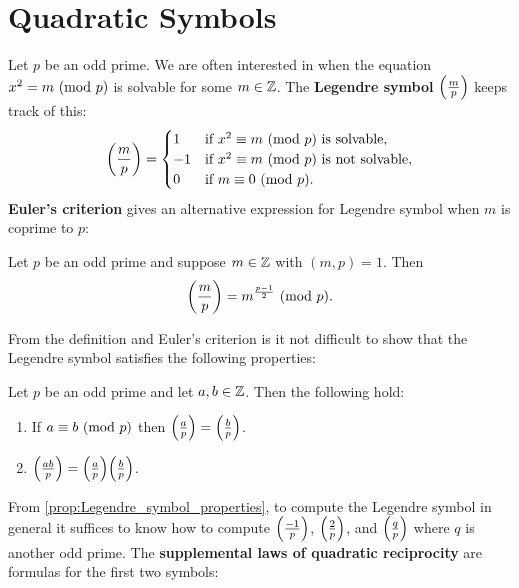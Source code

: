   \section{Quadratic Symbols}\label{append:Quadratic_Symbols}
    Let $p$ be an odd prime. We are often interested in when the equation $x^{2} = m \ (\mathrm{mod}\text{ }p)$ is solvable for some $m \in \mathbb{Z}$. The \textbf{Legendre symbol} $\textstyle{\left(\frac{m}{p}\right)}$ keeps track of this:
    \[
      \left(\frac{m}{p}\right) = \begin{cases} 1 & \text{if $x^{2} \equiv m \ (\mathrm{mod}\text{ }p)$ is solvable}, \\ -1 & \text{if $x^{2} \equiv m \ (\mathrm{mod}\text{ }p)$ is not solvable}, \\ 0 & \text{if $m \equiv 0 \ (\mathrm{mod}\text{ }p)$}. \end{cases}
    \]
    \textbf{Euler's criterion} gives an alternative expression for Legendre symbol when $m$ is coprime to $p$:
    \begin{proposition*}
      Let $p$ be an odd prime and suppose $m \in \mathbb{Z}$ with $(m,p) = 1$. Then
      \[
        \left(\frac{m}{p}\right) = m^{\frac{p-1}{2}} \ (\mathrm{mod}\text{ }p).
      \]
    \end{proposition*}
    From the definition and Euler's criterion is it not difficult to show that the Legendre symbol satisfies the following properties:
    \begin{proposition}\label{prop:Legendre_symbol_properties}
      Let $p$ be an odd prime and let $a,b \in \mathbb{Z}$. Then the following hold:
      \begin{enumerate}[label=(\roman*)]
        \item If $a \equiv b \ (\mathrm{mod}\text{ }p)$ then $\textstyle{\left(\frac{a}{p}\right)} = \textstyle{\left(\frac{b}{p}\right)}$.
        \item $\textstyle{\left(\frac{ab}{p}\right)} = \textstyle{\left(\frac{a}{p}\right)}\textstyle{\left(\frac{b}{p}\right)}$.
      \end{enumerate}
    \end{proposition}
    From \cref{prop:Legendre_symbol_properties}, to compute the Legendre symbol in general it suffices to know how to compute $\textstyle{\left(\frac{-1}{p}\right)}$, $\textstyle{\left(\frac{2}{p}\right)}$, and $\textstyle{\left(\frac{q}{p}\right)}$ where $q$ is another odd prime. The \textbf{supplemental laws of quadratic reciprocity} are formulas for the first two symbols:

